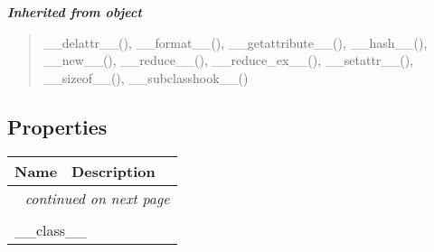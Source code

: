 \large{\textbf{\textit{Inherited from object}}}

\begin{quote}
\_\_delattr\_\_(), \_\_format\_\_(), \_\_getattribute\_\_(), \_\_hash\_\_(), \_\_new\_\_(), \_\_reduce\_\_(), \_\_reduce\_ex\_\_(), \_\_setattr\_\_(), \_\_sizeof\_\_(), \_\_subclasshook\_\_()
\end{quote}


  \subsection{Properties}

    \vspace{-1cm}
\hspace{\varindent}\begin{longtable}{|p{\varnamewidth}|p{\vardescrwidth}|l}
\cline{1-2}
\cline{1-2} \centering \textbf{Name} & \centering \textbf{Description}& \\
\cline{1-2}
\endhead\cline{1-2}\multicolumn{3}{r}{\small\textit{continued on next page}}\\\endfoot\cline{1-2}
\endlastfoot\multicolumn{2}{|l|}{\textit{Inherited from object}}\\
\multicolumn{2}{|p{\varwidth}|}{\raggedright \_\_class\_\_}\\
\cline{1-2}
\end{longtable}

